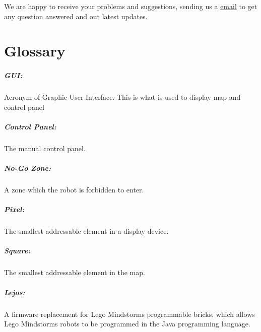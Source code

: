 \documentclass[11pt, a4paper]{report}
\begin{document}
We are happy to receive your problems and suggestions, sending us a \href{ro13botech@gmail.com}{email} to get any question answered and out latest updates.

\chapter{Glossary}


\paragraph{GUI:} Acronym of Graphic User Interface. This is what is used to display map and control panel

\paragraph{Control Panel:} The manual control panel.

\paragraph{No-Go Zone:} A zone which the robot is forbidden to enter.

\paragraph{Pixel:} The smallest addressable element in a display device.

\paragraph{Square:} The smallest addressable element in the map.

\paragraph{Lejos:} A firmware replacement for Lego Mindstorms programmable bricks, which allows Lego Mindstorms robots to be programmed in the Java programming language.


\pagebreak{}
\end{document}
